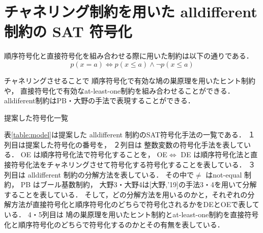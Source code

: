 \section{チャネリング制約を用いた alldifferent 制約の SAT 符号化}

順序符号化と直接符号化を組み合わせる際に用いた制約は以下の通りである．
$$p(x=a) \Leftrightarrow p(x \leq a) \land \lnot p(x \leq a)$$

チャネリングさせることで
順序符号化で有効な鳩の巣原理を用いたヒント制約や，
直接符号化で有効なat-least-one制約を組み合わせることができる．
alldiferent制約はPB・大野\cite{Ono19:ai}の手法で表現することができる．


\begin{table}[]
    \caption{提案した符号化一覧}
    \label{table:model}
    {\tiny }
\end{table}

表\ref{table:model}は提案した alldifferent 制約のSAT符号化手法の一覧である．
１列目は提案した符号化の番号を，
２列目は 整数変数の符号化手法を表している．
OE は順序符号化法で符号化することを，
OE$\Leftrightarrow$ DE は順序符号化法と直接符号化法をチャネリングさせて符号化する符号化することを表している．
３列目は alldifferent 制約の分解方法を表している．
その中で$\neq$ はnot-equal 制約，
PB はブール基数制約，
大野3・大野4は[大野,'19]の手法3・4を用いて分解することを表している．
そして，どの分解方法を用いるのかと，それぞれの分解方法が直接符号化と順序符号化のどちらで符号化されるかをDEとOEで表している．
4・5列目は 鳩の巣原理を用いたヒント制約とat-least-one制約を直接符号化と順序符号化のどちらで符号化するのかとその有無を表している．




